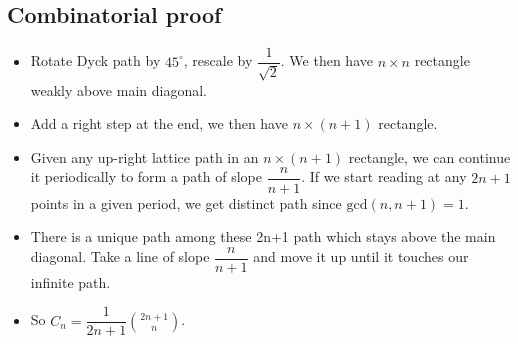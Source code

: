 \subsection{Combinatorial proof}
\begin{itemize}
\item Rotate Dyck path by $45^{\circ}$, rescale by $\dfrac{1}{\sqrt{2}}$. We then have $n\times n$ rectangle weakly above main diagonal.
\item Add a right step at the end, we then have $n\times (n+1)$ rectangle.
\item Given any up-right lattice path in an $n\times (n+1)$ rectangle, we can continue it periodically to form a path of slope $\dfrac{n}{n+1}$. If we start reading at any $2n+1$ points in a given period, we get distinct path since $\mathrm{gcd}(n,n+1)=1$.
\item There is a unique path among these 2n+1 path which stays above the main diagonal. Take a line of slope $\dfrac{n}{n+1}$ and move it up until it touches our infinite path.
\item So $C_n = \dfrac{1}{2n+1}{2n+1 \choose n}$.
\end{itemize}



